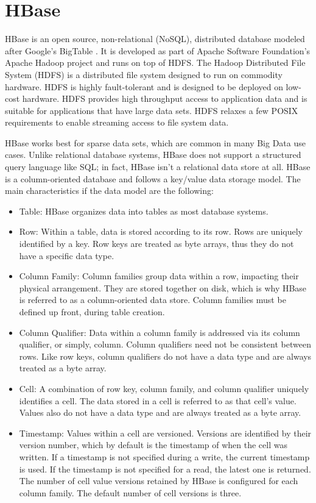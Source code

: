 \section{HBase}

HBase is an open source, non-relational (NoSQL), distributed database modeled after Google's BigTable \cite{24}. It is developed as part of Apache Software Foundation's Apache 
Hadoop project and runs on top of HDFS. The Hadoop Distributed File System (HDFS) is a distributed file system designed to run on commodity hardware. 
HDFS is highly fault-tolerant and is designed to be deployed on low-cost hardware. HDFS provides high throughput access to application data and is suitable 
for applications that have large data sets. HDFS relaxes a few POSIX requirements to enable streaming access to file system data. 

HBase works best for sparse data sets, which are common in many Big Data use cases. Unlike relational database systems, HBase does not support a 
structured query language like SQL; in fact, HBase isn’t a relational data store at all. HBase  is a column-oriented database and follows a 
key/value data storage model. The main characteristics if the data model are the following: 

\begin{itemize}
 \item Table: HBase organizes data into tables as most database systems.
 \item Row: Within a table, data is stored according to its row. Rows are uniquely identified by a key. Row keys are treated as byte arrays, thus they do not 
 have a specific data type.
 \item Column Family: Column families group data within a row, impacting their physical arrangement. They are stored together on disk, which is why 
 HBase is referred to as a column-oriented data store. Column families must be defined up front, during table creation. 
 \item Column Qualifier: Data within a column family is addressed via its column qualifier, or simply, column. Column qualifiers need not be consistent 
 between rows. Like row keys, column qualifiers do not have a data type and are always treated as a byte array.
 \item Cell: A combination of row key, column family, and column qualifier uniquely identifies a cell. The data stored in a cell is 
 referred to as that cell’s value. Values also do not have a data type and are always treated as a byte array.
 \item Timestamp: Values within a cell are versioned. Versions are identified by their version number, which by default is the timestamp of when the cell was written. 
If a timestamp is not specified during a write, the current timestamp is used. If the timestamp is not specified for a read, the latest one is returned. The number 
of cell value versions retained by HBase is configured for each column family. The default number of cell versions is three.
\end{itemize}

